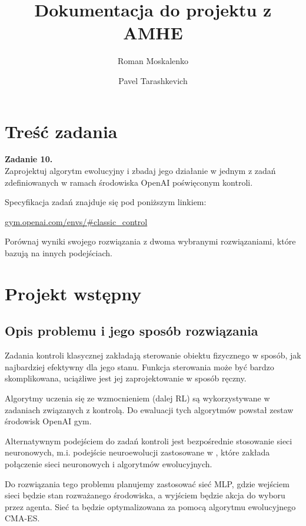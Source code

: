 \documentclass[12pt,a4paper]{article}
\title{Dokumentacja do projektu z AMHE}
\author{Roman Moskalenko \and Pavel Tarashkevich}
\date{}
\begin{document}
\maketitle

\section{Treść zadania}

\textbf{Zadanie 10.}\\

Zaprojektuj algorytm ewolucyjny i zbadaj jego działanie w jednym z zadań zdefiniowanych w ramach środowiska OpenAI poświęconym kontroli.

Specyfikacja zadań znajduje się pod poniższym linkiem:

\href{https://gym.openai.com/envs/#classic\_control}{gym.openai.com/envs/\#classic\_control}

Porównaj wyniki swojego rozwiązania z dwoma wybranymi rozwiązaniami, które bazują na
innych podejściach.


\section{Projekt wstępny}

\subsection{Opis problemu i jego sposób rozwiązania}

Zadania kontroli klasycznej zakładają sterowanie obiektu fizycznego w sposób,
jak najbardziej efektywny dla jego stanu. Funkcja sterowania może być bardzo
skomplikowana, uciążliwe jest jej zaprojektowanie w sposób ręczny.

Algorytmy uczenia się ze wzmocnieniem (dalej RL) są wykorzystywane w zadaniach związanych z kontrolą.
Do ewaluacji tych algorytmów powstał zestaw środowisk OpenAI gym.

Alternatywnym podejściem do zadań kontroli jest bezpośrednie stosowanie sieci
neuronowych, m.i. podejście neuroewolucji zastosowane w \cite{scalable_alternative},
które zakłada połączenie sieci neuronowych i algorytmów ewolucyjnych.

Do rozwiązania tego problemu planujemy zastosować sieć MLP, gdzie wejściem sieci
będzie stan rozważanego środowiska, a wyjściem będzie akcja do wyboru przez agenta.
Sieć ta będzie optymalizowana za pomocą algorytmu ewolucyjnego CMA-ES.
\end{document}
